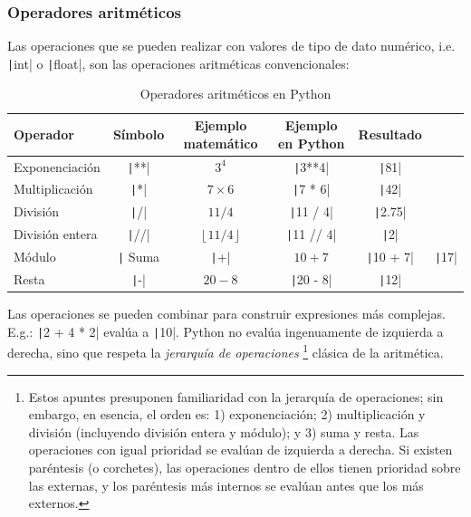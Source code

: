 \subsubsection{Operadores aritméticos}

Las operaciones que se pueden realizar con valores de tipo de dato numérico, i.e. \texttt|int| o \texttt|float|, son las operaciones aritméticas convencionales:

\begin{table}[h]
\centering
\begin{tabular}{|l|c|c|c|c|}
\hline
\textbf{Operador} & \textbf{Símbolo} & \textbf{Ejemplo matemático} & \textbf{Ejemplo en Python} & \textbf{Resultado} \\
\hline
Exponenciación & \texttt|**| & $3^4$ & \texttt|3**4| & \texttt|81| \\
\hline
Multiplicación & \texttt|*| & $7 \times 6$ & \texttt|7 * 6| & \texttt|42| \\
\hline
División & \texttt|/| & $11 / 4$ & \texttt|11 / 4| & \texttt|2.75| \\
\hline
División entera & \texttt|//| & $\left\lfloor 11 / 4 \right\rfloor$ & \texttt|11 // 4| & \texttt|2| \\
\hline
Módulo & \texttt|%
\hline
Suma & \texttt|+| & $10 + 7$ & \texttt|10 + 7| & \texttt|17| \\
\hline
Resta & \texttt|-| & $20 - 8$ & \texttt|20 - 8| & \texttt|12| \\
\hline
\end{tabular}
\caption{Operadores aritméticos en Python}
\label{tab:operadores-aritmeticos}
\end{table}

Las operaciones se pueden combinar para construir expresiones más complejas. E.g.: \texttt|2 + 4 * 2| evalúa a \texttt|10|. Python no evalúa ingenuamente de izquierda a derecha, sino que respeta la \emph{jerarquía de operaciones}%
%
\footnote{Estos apuntes presuponen familiaridad con la jerarquía de operaciones; sin embargo, en esencia, el orden es: 1) exponenciación; 2) multiplicación y división (incluyendo división entera y módulo); y 3) suma y resta. Las operaciones con igual prioridad se evalúan de izquierda a derecha. Si existen paréntesis (o corchetes), las operaciones dentro de ellos tienen prioridad sobre las externas, y los paréntesis más internos se evalúan antes que los más externos.} %
%
clásica de la aritmética.

